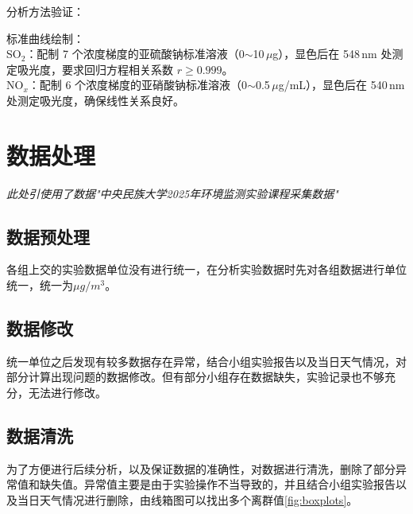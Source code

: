 \documentclass[12pt,hyperref,a4paper,UTF8]{ctexart}
\begin{document}
分析方法验证：

标准曲线绘制：\\
SO$_2$：配制 7 个浓度梯度的亚硫酸钠标准溶液（0$\sim$10\,$\mu$g），显色后在 548\,nm 处测定吸光度，要求回归方程相关系数 $r\geq0.999$。\\
NO$_x$：配制 6 个浓度梯度的亚硝酸钠标准溶液（0$\sim$0.5\,$\mu$g/mL），显色后在 540\,nm 处测定吸光度，确保线性关系良好。


\section{数据处理}
\textit{ 此处引使用了数据"中央民族大学2025年环境监测实验课程采集数据"}
\subsection{数据预处理}
各组上交的实验数据单位没有进行统一，在分析实验数据时先对各组数据进行单位统一，统一为$\mu g/m^3$。
\subsection{数据修改}
统一单位之后发现有较多数据存在异常，结合小组实验报告以及当日天气情况，对部分计算出现问题的数据修改。但有部分小组存在数据缺失，实验记录也不够充分，无法进行修改。
\subsection{数据清洗}
为了方便进行后续分析，以及保证数据的准确性，对数据进行清洗，删除了部分异常值和缺失值。异常值主要是由于实验操作不当导致的，并且结合小组实验报告以及当日天气情况进行删除，由线箱图可以找出多个离群值\ref{fig:boxplots}。
\end{document}
